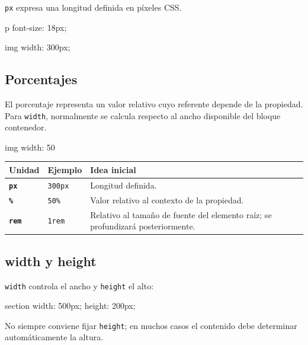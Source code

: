 \documentclass[11pt]{article}
\begin{document}
    \texttt{px} expresa una longitud definida en píxeles CSS.

    \begin{csscodedark}
        p {
            font-size: 18px;
        }

        img {
            width: 300px;
        }
    \end{csscodedark}

    \subsection{Porcentajes}

    El porcentaje representa un valor relativo cuyo referente depende de la propiedad. Para \texttt{width}, normalmente se calcula respecto al ancho disponible del bloque contenedor.

    \begin{csscodedark}
        img {
            width: 50%
        }
    \end{csscodedark}

    \begin{center}
        \begin{tabularx}{0.9\textwidth}{>{\bfseries}p{2.5cm}p{3cm}X}
            \toprule
            Unidad & Ejemplo & Idea inicial \\
            \midrule
            \texttt{px} & \texttt{300px} & Longitud definida. \\
            \texttt{\%} & \texttt{50\%} & Valor relativo al contexto de la propiedad. \\
            \texttt{rem} & \texttt{1rem} & Relativo al tamaño de fuente del elemento raíz; se profundizará posteriormente. \\
            \bottomrule
        \end{tabularx}
    \end{center}

    \subsection{width y height}

    \texttt{width} controla el ancho y \texttt{height} el alto:

    \begin{csscodedark}
        section {
            width: 500px;
            height: 200px;
        }
    \end{csscodedark}

    No siempre conviene fijar \texttt{height}; en muchos casos el contenido debe determinar automáticamente la altura.
\end{document}
